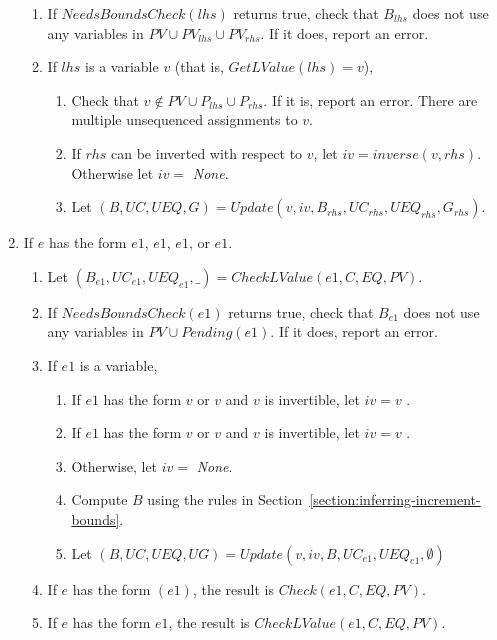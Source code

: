 \begin{enumerate}
\begin{enumerate}
\item If $NeedsBoundsCheck(lhs)$ returns true, check that $B_{lhs}$ does not use any variables in 
$PV \cup PV_{lhs} \cup PV_{rhs}$.  If it does, report an error.
\item  If $lhs$ is a variable $v$ (that is, $GetLValue(lhs) = { v }$),
\begin{enumerate}
\item Check that $v \notin PV \cup P_{lhs} \cup P_{rhs}$.  If it is, report an error.  
There are multiple unsequenced assignments to $v$.
\item If $rhs$ can be inverted with respect to $v$, let $iv = inverse(v, rhs)$.   Otherwise
let $iv = $ {\it None}.
\item Let $(B, UC, UEQ, G) = Update(v, iv, B_{rhs}, UC_{rhs}, UEQ_{rhs}, G_{rhs})$.
\end{enumerate}
\end{enumerate}

\item If $e$ has the form \code{++}$e1$, \code{--}$e1$, $e1$\code{++}, or $e1$\code{--}.
\begin{enumerate}
\item Let $(B_{e1}, {UC}_{e1}, {UEQ}_{e1}, \_) = CheckLValue(e1, C, EQ, PV)$. 
\item If $NeedsBoundsCheck(e1)$ returns true, check that $B_{e1}$ does not use any variables in 
$PV \cup Pending(e1)$.  If it does, report an error.
\item If $e1$ is a variable,
\begin{enumerate}
\item If $e1$ has the form \code{++}$v$ or $v$\code{++} and $v$  is invertible, 
let $iv = v$ .
\item If $e1$ has the form \code{--}$v$ or $v$\code{--} and $v$  is invertible, 
let $iv = v$ .
\item Otherwise, let $iv = $ {\em None}.
\item Compute $B$ using the rules in Section~\ref{section:inferring-increment-bounds}.
\item Let $(B, UC, UEQ, UG) = Update(v, iv, B, UC_{e1}, UEQ_{e1}, \emptyset)$
\end{enumerate}

\item If $e$ has the form $(e1)$, the result is $Check(e1, C, EQ, PV)$.

\item If $e$ has the form \code{&}$e1$, the result is $CheckLValue(e1, C, EQ,PV)$.
\end{enumerate}


\end{enumerate}
